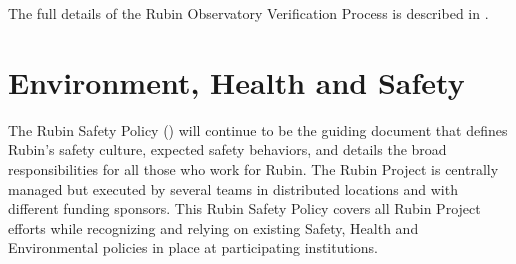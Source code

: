 \documentclass[SE,lsstdraft,authoryear,toc]{lsstdoc, lsstdraft}
\begin{document}
The full details of the Rubin Observatory Verification Process is described in .

%

\section{Environment, Health and Safety}

The Rubin Safety Policy () will continue to be the guiding document that defines Rubin's safety culture, expected safety behaviors, and details the broad responsibilities for all those who work for Rubin.
The Rubin Project is centrally managed but executed by several teams in distributed locations and with different funding sponsors.
This Rubin Safety Policy covers all Rubin Project efforts while recognizing and relying on existing Safety,
Health and Environmental policies in place at participating institutions.
\end{document}
